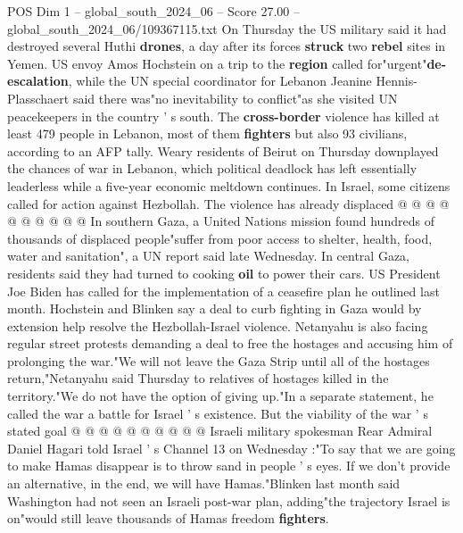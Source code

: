 \begin{textsample}{POS Dim 1 – global\_south\_2024\_06 – Score 27.00 – global\_south\_2024\_06/109367115.txt}
On Thursday the US military said it had destroyed several Huthi \textbf{drones}, a day after its forces \textbf{struck} two \textbf{rebel} sites in Yemen.
US envoy Amos Hochstein on a trip to the \textbf{region} called for"urgent"\textbf{de-escalation}, while the UN special coordinator for Lebanon Jeanine Hennis-Plasschaert said there was"no inevitability to conflict"as she visited UN peacekeepers in the country ' s south.
The \textbf{cross-border} violence has killed at least 479 people in Lebanon, most of them \textbf{fighters} but also 93 civilians, according to an AFP tally.
Weary residents of Beirut on Thursday downplayed the chances of war in Lebanon, which political deadlock has left essentially leaderless while a five-year economic meltdown continues.
In Israel, some citizens called for action against Hezbollah.
The violence has already displaced @ @ @ @ @ @ @ @ @ @ In southern Gaza, a United Nations mission found hundreds of thousands of displaced people"suffer from poor access to shelter, health, food, water and sanitation", a UN report said late Wednesday.
In central Gaza, residents said they had turned to cooking \textbf{oil} to power their cars.
US President Joe Biden has called for the implementation of a ceasefire plan he outlined last month.
Hochstein and Blinken say a deal to curb fighting in Gaza would by extension help resolve the Hezbollah-Israel violence.
Netanyahu is also facing regular street protests demanding a deal to free the hostages and accusing him of prolonging the war."We will not leave the Gaza Strip until all of the hostages return,"Netanyahu said Thursday to relatives of hostages killed in the territory."We do not have the option of giving up."In a separate statement, he called the war a battle for Israel ' s existence.
But the viability of the war ' s stated goal @ @ @ @ @ @ @ @ @ @ Israeli military spokesman Rear Admiral Daniel Hagari told Israel ' s Channel 13 on Wednesday :"To say that we are going to make Hamas disappear is to throw sand in people ' s eyes.
If we don't provide an alternative, in the end, we will have Hamas."Blinken last month said Washington had not seen an Israeli post-war plan, adding"the trajectory Israel is on"would still leave thousands of Hamas freedom \textbf{fighters}.

\end{textsample}
